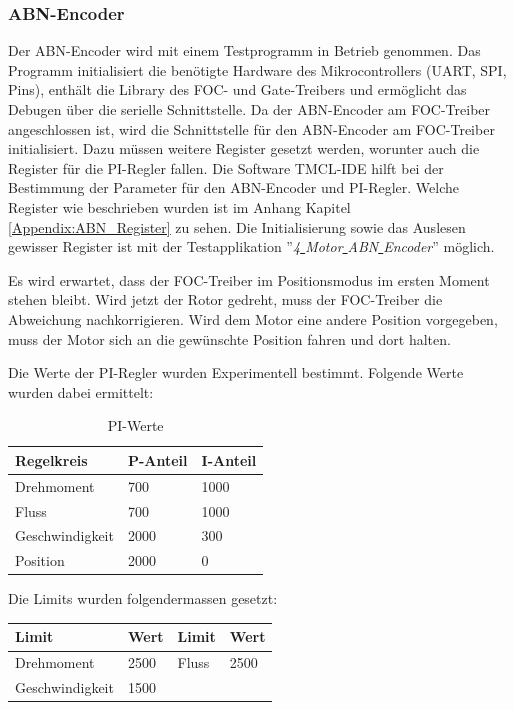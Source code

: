 \subsubsection{ABN-Encoder}
\label{subsubsec:Inbetriebnahme_ABN-Encoder}

Der ABN-Encoder wird mit einem Testprogramm in Betrieb genommen. Das Programm initialisiert die benötigte Hardware des Mikrocontrollers (UART, SPI, Pins), enthält die Library des FOC- und Gate-Treibers und ermöglicht das Debugen über die serielle Schnittstelle. Da der ABN-Encoder am FOC-Treiber angeschlossen ist, wird die Schnittstelle für den ABN-Encoder am FOC-Treiber initialisiert. Dazu müssen weitere Register gesetzt werden, worunter auch die Register für die PI-Regler fallen. Die Software TMCL-IDE hilft bei der Bestimmung der Parameter für den ABN-Encoder und PI-Regler. Welche Register wie beschrieben wurden ist im Anhang Kapitel \ref{Appendix:ABN_Register} zu sehen. Die Initialisierung sowie das Auslesen gewisser Register ist mit der Testapplikation ''\textit{4\underline{ }Motor\underline{ }ABN\underline{ }Encoder}'' möglich.

Es wird erwartet, dass der FOC-Treiber im Positionsmodus im ersten Moment stehen bleibt. Wird jetzt der Rotor gedreht, muss der FOC-Treiber die Abweichung nachkorrigieren. Wird dem Motor eine andere Position vorgegeben, muss der Motor sich an die gewünschte Position fahren und dort halten.

Die Werte der PI-Regler wurden Experimentell bestimmt. Folgende Werte wurden dabei ermittelt:
\begin{table}
\begin{tabularx}{\linewidth}{|l|X|X|}
\hline
\textbf{Regelkreis} & \textbf{P-Anteil} & \textbf{I-Anteil}\\
\hline
Drehmoment & 700 & 1000\\
\hline
Fluss & 700 & 1000\\
\hline
Geschwindigkeit & 2000 & 300\\
\hline
Position & 2000 & 0\\
\hline
\end{tabularx}
\caption{PI-Werte}
\label{tab:PI}
\end{table}


Die Limits wurden folgendermassen gesetzt:

\begin{tabularx}{\linewidth}{|l|X||l|X|}
\hline
\textbf{Limit} & \textbf{Wert} & \textbf{Limit} & \textbf{Wert}\\
\hline
Drehmoment & 2500 & Fluss & 2500\\
\hline
Geschwindigkeit & 1500 &  & \\
\hline
\end{tabularx}

